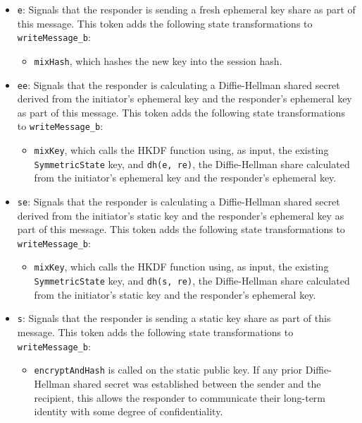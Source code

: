 \begin{itemize}

\item \texttt{e}: Signals that the responder is sending a fresh ephemeral key share as part of this message. This token adds the following state transformations to \texttt{writeMessage\_b}:
\begin{itemize}

\item \texttt{mixHash}, which hashes the new key into the session hash.
\end{itemize}


\item \texttt{ee}: Signals that the responder is calculating a Diffie-Hellman shared secret derived from the initiator's ephemeral key and the responder's ephemeral key as part of this message. This token adds the following state transformations to \texttt{writeMessage\_b}:
\begin{itemize}

\item \texttt{mixKey}, which calls the HKDF function using, as input, the existing \texttt{SymmetricState} key, and \texttt{dh(e, re)}, the Diffie-Hellman share calculated from the initiator's ephemeral key and the responder's ephemeral key.
\end{itemize}


\item \texttt{se}: Signals that the responder is calculating a Diffie-Hellman shared secret derived from the initiator's static key and the responder's ephemeral key as part of this message. This token adds the following state transformations to \texttt{writeMessage\_b}:
\begin{itemize}

\item \texttt{mixKey}, which calls the HKDF function using, as input, the existing \texttt{SymmetricState} key, and \texttt{dh(s, re)}, the Diffie-Hellman share calculated from the initiator's static key and the responder's ephemeral key.
\end{itemize}


\item \texttt{s}: Signals that the responder is sending a static key share as part of this message. This token adds the following state transformations to \texttt{writeMessage\_b}:
\begin{itemize}

\item \texttt{encryptAndHash} is called on the static public key. If any prior Diffie-Hellman shared secret was established between the sender and the recipient, this allows the responder to communicate their long-term identity with some degree of confidentiality.
\end{itemize}



\end{itemize}
